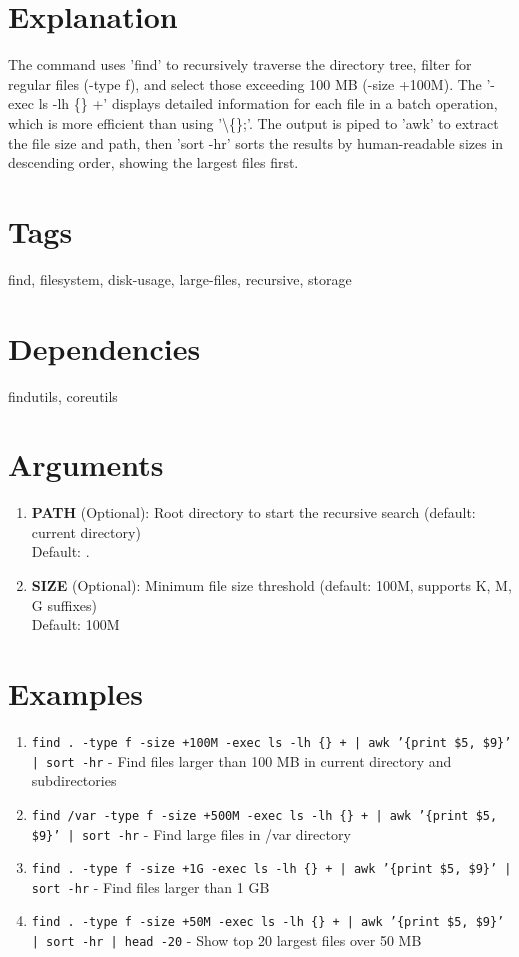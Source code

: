 \documentclass[openany]{book}
\begin{document}
\section*{Explanation}
The command uses 'find' to recursively traverse the directory tree, filter for regular files (-type f), and select those exceeding 100 MB (-size +100M). The '-exec ls -lh \{\} +' displays detailed information for each file in a batch operation, which is more efficient than using '\textbackslash\{\};'. The output is piped to 'awk' to extract the file size and path, then 'sort -hr' sorts the results by human-readable sizes in descending order, showing the largest files first.

\section*{Tags}
find, filesystem, disk-usage, large-files, recursive, storage

\section*{Dependencies}
findutils, coreutils


\section*{Arguments}
\begin{enumerate}
  \item \textbf{PATH} (Optional): Root directory to start the recursive search (default: current directory) \\ Default: .
  \item \textbf{SIZE} (Optional): Minimum file size threshold (default: 100M, supports K, M, G suffixes) \\ Default: 100M
\end{enumerate}

\section*{Examples}
\begin{enumerate}
  \item \texttt{find . -type f -size +100M -exec ls -lh \{\} + | awk '\{print \$5, \$9\}' | sort -hr} - Find files larger than 100 MB in current directory and subdirectories
  \item \texttt{find /var -type f -size +500M -exec ls -lh \{\} + | awk '\{print \$5, \$9\}' | sort -hr} - Find large files in /var directory
  \item \texttt{find . -type f -size +1G -exec ls -lh \{\} + | awk '\{print \$5, \$9\}' | sort -hr} - Find files larger than 1 GB
  \item \texttt{find . -type f -size +50M -exec ls -lh \{\} + | awk '\{print \$5, \$9\}' | sort -hr | head -20} - Show top 20 largest files over 50 MB
\end{enumerate}
\end{document}
